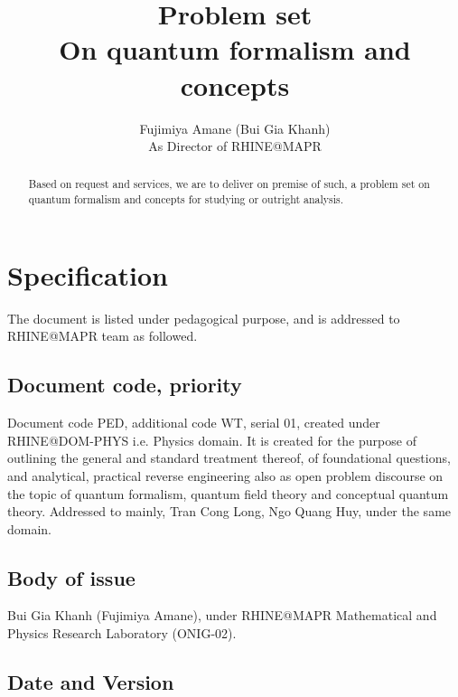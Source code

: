 \documentclass[10pt,a4paper]{article}
\title{\textbf{Problem set} \\ On quantum formalism and concepts} %
\author{Fujimiya Amane (Bui Gia Khanh) \\ {\small As Director of RHINE@MAPR}} %
\affiliation{} %
\begin{document}
\maketitle

\begin{abstract}
    \noindent
    Based on request and services, we are to deliver on premise of such, a problem set on quantum formalism and concepts for studying or outright analysis. 

\end{abstract}

\vspace{2.5cm}



\thispagestyle{firstpage}

\pagebreak


\newgeometry{} %

\section{Specification}
\label{sec:spec}

The document is listed under pedagogical purpose, and is addressed to RHINE@MAPR team as followed. 

\subsection{Document code, priority}

Document code PED, additional code WT, serial 01, created under RHINE@DOM-PHYS i.e. Physics domain. It is created for the purpose of outlining the general and standard treatment thereof, of foundational questions, and analytical, practical reverse engineering also as open problem discourse on the topic of quantum formalism, quantum field theory and conceptual quantum theory. Addressed to mainly, Tran Cong Long, Ngo Quang Huy, under the same domain. 

\subsection{Body of issue}

Bui Gia Khanh (Fujimiya Amane), under RHINE@MAPR Mathematical and Physics Research Laboratory (ONIG-02). 

\subsection{Date and Version}
\end{document}
